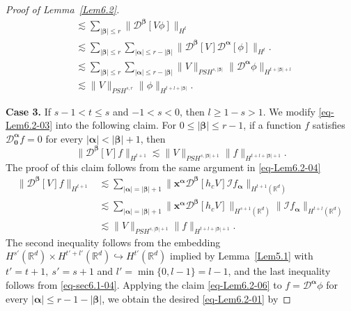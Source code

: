 \documentclass{sn-jnl}%
\newcommand{\nm}[1]{\| #1 \|}
\newcommand{\bnm}[1]{\bigl\| #1 \bigr\|}
\numberwithin{equation}{section}
\theoremstyle{thmstyleone}%
\theoremstyle{thmstyletwo}%
\theoremstyle{thmstylethree}%
\begin{document}
\begin{proof}[Proof of Lemma~\ref{Lem6.2}]
\begin{equation}
\begin{aligned}
    &\lesssim
    \sum_{|\bm \beta|\leq r}\bigl\|\mathcal{D}^{\bm \beta}[V\phi]\bigr\|_{H^{t}}
    \\&\lesssim
    \sum_{|\bm \beta|\leq r}\sum_{|\bm \alpha|\leq r-|\bm \beta|}\bnm{\mathcal{D}^{\bm \beta}[V]\mathcal{D}^{\bm \alpha}[\phi]}_{H^t}.
    \\&\lesssim
    \sum_{|\bm \beta|\leq r}\sum_{|\bm \alpha|\leq r-|\bm \beta|}
    \nm{V}_{PSH^{s,|\bm \beta|}}\bnm{\mathcal{D}^{\bm \alpha}\phi}_{H^{t+|\bm \beta|+l}}
    \\&\lesssim
    \nm{V}_{PSH^{s,r}}\nm{\phi}_{H^{t+l+|\bm \beta|}}.
    \end{aligned}
    \end{equation}  
   
    \textbf{Case 3.} If $s-1<t\leq s$ and $-1<s<0$, then $l\geq1-s>1$. 
    We modify \eqref{eq-Lem6.2-03} into the following claim. For $0\leq |\bm \beta|\leq r-1$, if a function $f$ satisfies $\mathcal{D}_{\bm 0}^{\bm \alpha}f = 0$ for every $|\bm \alpha|<|\bm \beta|+1$, then
    \begin{equation}\label{eq-Lem6.2-06}
        \|\mathcal{D}^{\bm \beta}[V]f\|_{H^{t+1}}\lesssim \|V\|_{PSH^{s,|\bm \beta|+1}}\|f\|_{H^{t+l+|\bm \beta|+1}}.
    \end{equation}
    The proof of this claim follows from the same argument in \eqref{eq-Lem6.2-04} 
    \begin{equation}\label{eq-Lem6.2-07}
    \begin{aligned}
        \bnm{\mathcal{D}^{\bm \beta}[V]f}_{H^{t+1}}
        &\lesssim 
        \sum_{|\bm \alpha|=|\bm \beta|+1}
        \bnm{\bm x^{\bm \alpha}\mathcal{D}^{\bm \beta}[h_cV]\mathcal{I}f_{\bm \alpha}}_{H^{t+1}(\mathbb{R}^d)}
        \\&\lesssim 
        \sum_{|\bm \alpha|=|\bm \beta|+1}
        \bnm{\bm x^{\bm \alpha}\mathcal{D}^{\bm \beta}[h_cV]}_{H^{s+1}(\mathbb{R}^d)}
        \nm{\mathcal{I}f_{\bm \alpha}}_{H^{t+l}(\mathbb{R}^d)}\\
        &\lesssim \nm{V}_{PSH^{s,|\bm \beta|+1}}\|f\|_{H^{t+l+|\bm \beta|+1}}.
    \end{aligned}
    \end{equation}
    The second inequality follows from the embedding $H^{s'}(\mathbb{R}^d)\times H^{t'+l'}(\mathbb{R}^d)\hookrightarrow H^{t'}(\mathbb{R}^d)$ implied by Lemma~\ref{Lem5.1} with $t'=t+1,\ s'=s+1$ and $l'=\min\{0,l-1\}=l-1$, and the last inequality follows  from \eqref{eq-sec6.1-04}. Applying the claim \eqref{eq-Lem6.2-06} to $f = \mathcal{D}^{\bm \alpha}\phi$ for every $|\bm \alpha|\leq r-1-|\bm \beta|$, we obtain the desired \eqref{eq-Lem6.2-01} by

\end{proof}
\end{document}
